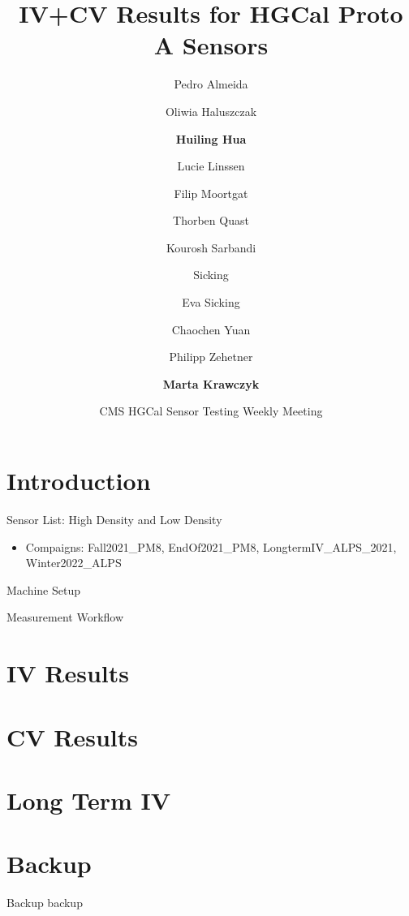 \documentclass{beamer}
\title[huilng.hua@cern.ch] %
{IV+CV Results for HGCal Proto A Sensors}
\author[Huiling Hua] %
{ Pedro Almeida\and Oliwia Haluszczak\and \textbf{Huiling Hua} \and Lucie Linssen\and Filip Moortgat\and Thorben Quast\and Kourosh Sarbandi\and Sicking\and Eva Sicking\and
Chaochen Yuan\and Philipp Zehetner\and \textbf{Marta Krawczyk} }
\date[2022.02.10] %
{CMS HGCal Sensor Testing Weekly Meeting}
\begin{document}
\begin{frame}
  \titlepage
\end{frame}

\section{Introduction}

\begin{frame}{Sensor List: High Density and Low Density}
    \begin{itemize}
        \item Compaigns: Fall2021\_PM8, EndOf2021\_PM8, LongtermIV\_ALPS\_2021, Winter2022\_ALPS
    \end{itemize}    
\end{frame}

\begin{frame}{Machine Setup}
    
\end{frame}

\begin{frame}{Measurement Workflow}
\end{frame}
    

  

\section{IV Results}

\section{CV Results}

\section{Long Term IV}




\section*{Backup}

\begin{frame}{Backup}
	\center
	\huge
	backup
\end{frame}
\end{document}
